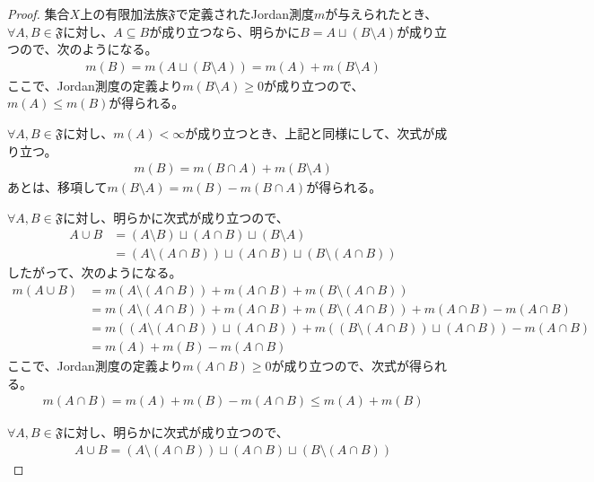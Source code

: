 \documentclass[dvipdfmx]{jsarticle}
\begin{document}
\begin{proof}
集合$X$上の有限加法族$\mathfrak{F}$で定義されたJordan測度$m$が与えられたとき、$\forall A,B \in \mathfrak{F}$に対し、$A \subseteq B$が成り立つなら、明らかに$B = A \sqcup (B \setminus A)$が成り立つので、次のようになる。
\begin{align*}
m(B) = m\left( A \sqcup (B \setminus A) \right) = m(A) + m(B \setminus A)
\end{align*}
ここで、Jordan測度の定義より$m(B \setminus A) \geq 0$が成り立つので、$m(A) \leq m(B)$が得られる。\par
$\forall A,B \in \mathfrak{F}$に対し、$m(A) < \infty$が成り立つとき、上記と同様にして、次式が成り立つ。
\begin{align*}
m(B) = m(B \cap A) + m(B \setminus A)
\end{align*}
あとは、移項して$m(B \setminus A) = m(B) - m(B \cap A)$が得られる。\par
$\forall A,B \in \mathfrak{F}$に対し、明らかに次式が成り立つので、
\begin{align*}
A \cup B &= (A \setminus B) \sqcup (A \cap B) \sqcup (B \setminus A)\\
&= \left( A \setminus (A \cap B) \right) \sqcup (A \cap B) \sqcup \left( B \setminus (A \cap B) \right)
\end{align*}
したがって、次のようになる。
\begin{align*}
m(A \cup B) &= m\left( A \setminus (A \cap B) \right) + m(A \cap B) + m\left( B \setminus (A \cap B) \right)\\
&= m\left( A \setminus (A \cap B) \right) + m(A \cap B) + m\left( B \setminus (A \cap B) \right) + m(A \cap B) - m(A \cap B)\\
&= m\left( \left( A \setminus (A \cap B) \right) \sqcup (A \cap B) \right) + m\left( \left( B \setminus (A \cap B) \right) \sqcup (A \cap B) \right) - m(A \cap B)\\
&= m(A) + m(B) - m(A \cap B)
\end{align*}
ここで、Jordan測度の定義より$m(A \cap B) \geq 0$が成り立つので、次式が得られる。
\begin{align*}
m(A \cap B) = m(A) + m(B) - m(A \cap B) \leq m(A) + m(B)
\end{align*}\par
$\forall A,B \in \mathfrak{F}$に対し、明らかに次式が成り立つので、
\begin{align*}
A \cup B = \left( A \setminus (A \cap B) \right) \sqcup (A \cap B) \sqcup \left( B \setminus (A \cap B) \right)
\end{align*}

\end{proof}
\end{document}
